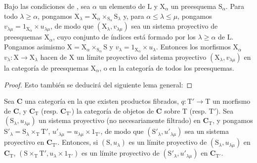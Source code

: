 \begin{proposition}[8.2.5]
\label{IV.8.2.5}
Bajo las condiciones de , sea $\alpha$ un elemento de $\mathrm{L}$ y $\mathrm{X}_\alpha$ un preesquema $\mathrm{S}_\alpha$.
Para todo $\lambda\geqslant\alpha$, pongamos $\mathrm{X}_\lambda=\mathrm{X}_\alpha\times_{\mathrm{S}_\alpha}\mathrm{S}_\lambda$ y, para $\alpha\leqslant\lambda\leqslant\mu$, pongamos $v_{\lambda\mu}=1_{\mathrm{X}_\alpha}\times u_{\lambda\mu}$, de modo que $(\mathrm{X}_\lambda,v_{\lambda\mu})$ sea un sistema proyectivo de preesquemas $\mathrm{X}_\alpha$, cuyo conjunto de índices está formado por los $\lambda\geqslant\alpha$ de $\mathrm{L}$.
Pongamos asimismo $\mathrm{X}=\mathrm{X}_\alpha\times_{\mathrm{S}_\alpha}\mathrm{S}$ y $v_\lambda=1_{\mathrm{X}_\alpha}\times u_\lambda$.
Entonces los morfismos $\mathrm{X}_\alpha$ $v_\lambda:\mathrm{X}\to\mathrm{X}_\lambda$ hacen de $\mathrm{X}$ un límite proyectivo del sistema proyectivo $(\mathrm{X}_\lambda,v_{\lambda\mu})$ en la categoría de preesquemas $\mathrm{X}_\alpha$, o en la categoría de todos los preesquemas.
\end{proposition}

\begin{proof}
Esto también se deducirá del siguiente lema general:
\end{proof}

\begin{lemma}[8.2.6]
\label{IV.8.2.6}
Sea $\mathbf{C}$ una categoría en la que existen productos fibrados, $q:\mathrm{T}'\to\mathrm{T}$ un morfismo de $\mathbf{C}$, y $\mathbf{C}_\mathrm{T}$ (resp. $\mathbf{C}_{\mathrm{T}'}$) la categoría de objetos de $\mathbf{C}$ sobre
$\mathrm{T}$ (resp. $\mathrm{T}'$).
Sea $(\mathrm{S}_\lambda,u_{\lambda\mu})$ un sistema proyectivo (no necesariamente filtrado) en $\mathbf{C}_\mathrm{T}$, y pongamos $\mathrm{S}'_\lambda=\mathrm{S}_\lambda\times_\mathrm{T}\mathrm{T}'$, $u'_{\lambda\mu}=u_{\lambda\mu}\times 1_{\mathrm{T}'}$, de modo que $(\mathrm{S}'_\lambda,u'_{\lambda\mu})$ sea un sistema proyectivo en $\mathbf{C}_{\mathrm{T}'}$.
Entonces, si $(\mathrm{S},u_\lambda)$ es un límite proyectivo de $(\mathrm{S}_\lambda,u_{\lambda\mu})$ en $\mathbf{C}_\mathrm{T}$, $(\mathrm{S}\times_\mathrm{T}\mathrm{T}',u_\lambda\times 1_{\mathrm{T}'})$ es un límite proyectivo de $(\mathrm{S}'_\lambda,u'_{\lambda\mu})$ en $\mathbf{C}_{\mathrm{T}'}$.
\end{lemma}

